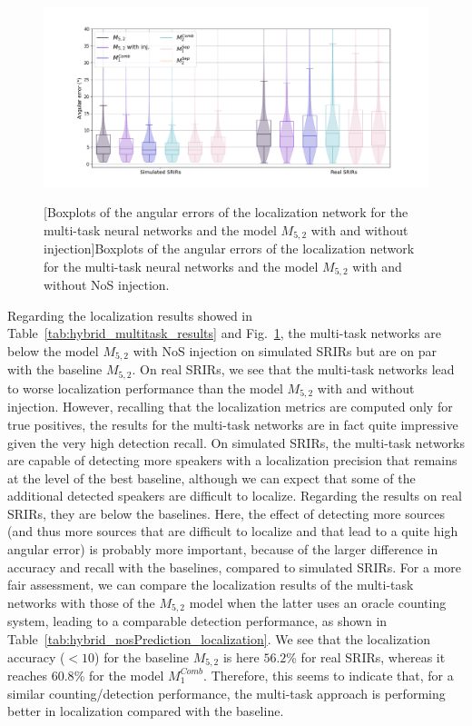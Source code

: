 \begin{figure}[t]
    \centering
        \begin{adjustbox}{width=1.1\textwidth,center}
            \includegraphics[width=.5\textwidth]{Images/chap8/hybrid_boxplots_multitask.png}
        \end{adjustbox}

    [Boxplots of the angular errors of the localization network for the multi-task neural networks and the model $M_{5,2}$ with and without injection]{Boxplots of the angular errors of the localization network for the multi-task neural networks and the model $M_{5,2}$ with and without NoS injection.}
    \label{fig:hybrid_boxplots_multitask}
\end{figure}

Regarding the localization results showed in Table~\ref{tab:hybrid_multitask_results} and Fig.~\ref{fig:hybrid_boxplots_multitask}, the multi-task networks are below the model $M_{5,2}$ with NoS injection on simulated SRIRs but are on par with the baseline $M_{5,2}$. On real SRIRs, we see that the multi-task networks lead to worse localization performance than the model $M_{5,2}$ with and without injection. However, recalling that the localization metrics are computed only for true positives, the results for the multi-task networks are in fact quite impressive given the very high detection recall. On simulated SRIRs, the multi-task networks are capable of detecting more speakers with a localization precision that remains at the level of the best baseline, although we can expect that some of the additional detected speakers are difficult to localize. Regarding the results on real SRIRs, they are below the baselines. Here, the effect of detecting more sources (and thus more sources that are difficult to localize and that lead to a quite high angular error) is probably more important, because of the larger difference in accuracy and recall with the baselines, compared to simulated SRIRs. For a more fair assessment, we can compare the localization results of the multi-task networks with those of the $M_{5,2}$ model when the latter uses an oracle counting system, leading to a comparable detection performance, as shown in Table~\ref{tab:hybrid_nosPrediction_localization}. We see that the localization accuracy ($<10$\textdegree) for the baseline $M_{5,2}$ is here $56.2$\% for real SRIRs, whereas it reaches $60.8$\% for the model $M^{Comb}_1$. Therefore, this seems to indicate that, for a similar counting/detection performance, the multi-task approach is performing better in localization compared with the baseline.


